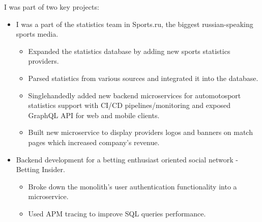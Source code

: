 I was part of two key projects:

\begin{itemize}
    \item I was a part of the statistics team in Sports.ru, the biggest russian-speaking sports media. 
        \begin{itemize}
            \item Expanded the statistics database by adding new sports statistics providers.
            \item Parsed statistics from various sources and integrated it into the database.
            \item Singlehandedly added new backend microservices for automotosport statistics 
                    support with CI/CD pipelines/monitoring and exposed GraphQL API for web and mobile clients. 
            \item Built new microservice to display providers logos and banners on match pages which 
                increased company's revenue.
        \end{itemize}
    \item Backend development for a betting enthusiast oriented social network - Betting Insider. 
        \begin{itemize}
            \item Broke down the monolith's user authentication functionality into a microservice.
            \item Used APM tracing to improve SQL queries performance.
        \end{itemize} 
    \end{itemize}
